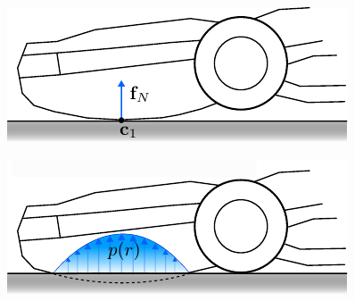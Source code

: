 \begin{center}
    \renewcommand{\arraystretch}{1.2}
    \begin{minipage}{.48\linewidth}
        \vspace{0pt}
        \centering
        \includegraphics[width=.95\textwidth]{chapters/modeling/fig/contact-single-point.pdf}
    \end{minipage}%
    \hfill%
    \begin{minipage}{.48\linewidth}
        \vspace{0pt}
        \centering
        \includegraphics[width=.95\textwidth]{chapters/modeling/fig/contact-surface.pdf}
    \end{minipage}%
    \vspace{15pt}
    \begin{minipage}[t]{.48\linewidth}
        \vspace{0pt}
        \captionsetup{type=figure}
        \label{fig:contact-single-point}
    \end{minipage}%
    \hfill%
    \begin{minipage}[t]{.48\linewidth}
        \vspace{0pt}
        \captionsetup{type=figure}
        \label{fig:contact-surface}
    \end{minipage}%
\end{center}

